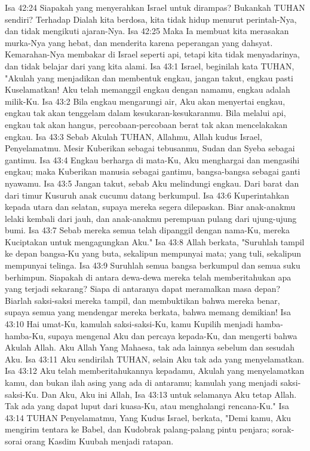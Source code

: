 Isa 42:24  Siapakah yang menyerahkan Israel untuk dirampas? Bukankah TUHAN sendiri? Terhadap Dialah kita berdosa, kita tidak hidup menurut perintah-Nya, dan tidak mengikuti ajaran-Nya.
Isa 42:25  Maka Ia membuat kita merasakan murka-Nya yang hebat, dan menderita karena peperangan yang dahsyat. Kemarahan-Nya membakar di Israel seperti api, tetapi kita tidak menyadarinya, dan tidak belajar dari yang kita alami.
Isa 43:1  Israel, beginilah kata TUHAN, "Akulah yang menjadikan dan membentuk engkau, jangan takut, engkau pasti Kuselamatkan! Aku telah memanggil engkau dengan namamu, engkau adalah milik-Ku.
Isa 43:2  Bila engkau mengarungi air, Aku akan menyertai engkau, engkau tak akan tenggelam dalam kesukaran-kesukaranmu. Bila melalui api, engkau tak akan hangus, percobaan-percobaan berat tak akan mencelakakan engkau.
Isa 43:3  Sebab Akulah TUHAN, Allahmu, Allah kudus Israel, Penyelamatmu. Mesir Kuberikan sebagai tebusanmu, Sudan dan Syeba sebagai gantimu.
Isa 43:4  Engkau berharga di mata-Ku, Aku menghargai dan mengasihi engkau; maka Kuberikan manusia sebagai gantimu, bangsa-bangsa sebagai ganti nyawamu.
Isa 43:5  Jangan takut, sebab Aku melindungi engkau. Dari barat dan dari timur Kusuruh anak cucumu datang berkumpul.
Isa 43:6  Kuperintahkan kepada utara dan selatan, supaya mereka segera dilepaskan. Biar anak-anakmu lelaki kembali dari jauh, dan anak-anakmu perempuan pulang dari ujung-ujung bumi.
Isa 43:7  Sebab mereka semua telah dipanggil dengan nama-Ku, mereka Kuciptakan untuk mengagungkan Aku."
Isa 43:8  Allah berkata, "Suruhlah tampil ke depan bangsa-Ku yang buta, sekalipun mempunyai mata; yang tuli, sekalipun mempunyai telinga.
Isa 43:9  Suruhlah semua bangsa berkumpul dan semua suku berhimpun. Siapakah di antara dewa-dewa mereka telah memberitahukan apa yang terjadi sekarang? Siapa di antaranya dapat meramalkan masa depan? Biarlah saksi-saksi mereka tampil, dan membuktikan bahwa mereka benar, supaya semua yang mendengar mereka berkata, bahwa memang demikian!
Isa 43:10  Hai umat-Ku, kamulah saksi-saksi-Ku, kamu Kupilih menjadi hamba-hamba-Ku, supaya mengenal Aku dan percaya kepada-Ku, dan mengerti bahwa Akulah Allah. Aku Allah Yang Mahaesa, tak ada lainnya sebelum dan sesudah Aku.
Isa 43:11  Aku sendirilah TUHAN, selain Aku tak ada yang menyelamatkan.
Isa 43:12  Aku telah memberitahukannya kepadamu, Akulah yang menyelamatkan kamu, dan bukan ilah asing yang ada di antaramu; kamulah yang menjadi saksi-saksi-Ku. Dan Aku, Aku ini Allah,
Isa 43:13  untuk selamanya Aku tetap Allah. Tak ada yang dapat luput dari kuasa-Ku, atau menghalangi rencana-Ku."
Isa 43:14  TUHAN Penyelamatmu, Yang Kudus Israel, berkata, "Demi kamu, Aku mengirim tentara ke Babel, dan Kudobrak palang-palang pintu penjara; sorak-sorai orang Kasdim Kuubah menjadi ratapan.
